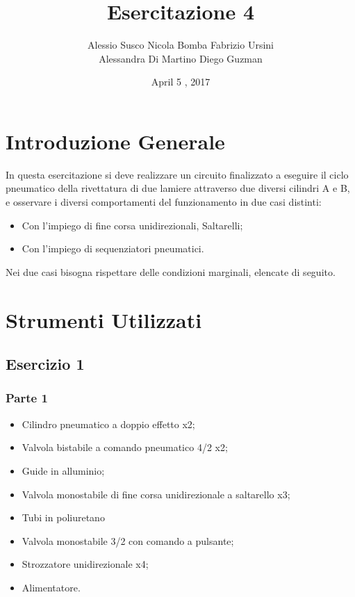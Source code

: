 \documentclass[a4paper]{article}
\begin{document}
\title{Esercitazione 4}
\date{April 5 , 2017}
\maketitle


\author{Alessio Susco \hspace*{2cm} Nicola Bomba \hspace*{2cm} Fabrizio Ursini  \\  \hspace*{1,85cm} Alessandra Di Martino \hspace*{1,25cm} Diego Guzman}

 

\tableofcontents

\clearpage

\section{Introduzione Generale}
In questa esercitazione si deve realizzare un circuito finalizzato a eseguire il ciclo pneumatico della rivettatura di due lamiere attraverso due diversi cilindri A e B, e osservare i diversi comportamenti del funzionamento in due casi distinti: 
\begin{itemize}
\item Con l’impiego di fine corsa unidirezionali, Saltarelli;
\item Con l’impiego di sequenziatori pneumatici.
\end{itemize}
Nei due casi bisogna rispettare delle condizioni marginali, elencate di seguito.

\section{Strumenti Utilizzati}

\subsection{Esercizio 1}

\subsubsection{Parte 1}
\begin{itemize}
\item Cilindro pneumatico a doppio effetto x2;
\item Valvola bistabile a comando pneumatico 4/2 x2;
\item Guide in alluminio;
\item Valvola monostabile di fine corsa unidirezionale a saltarello x3;
\item Tubi in poliuretano
\item Valvola monostabile 3/2 con comando a pulsante;
\item Strozzatore unidirezionale x4;
\item Alimentatore.
\end{itemize}
\end{document}
